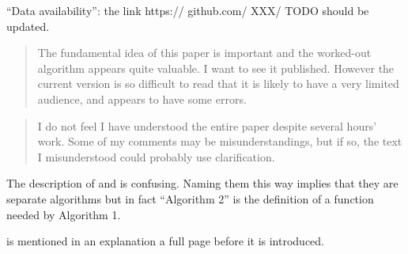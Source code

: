 \begin{point}{\revref} %
 ``Data availability'': the link https:// github.com/ XXX/ TODO should be updated.
\end{point}





\begin{quote}
The fundamental idea of this paper is important and the worked-out
algorithm appears quite valuable. I want to see it published. However
the current version is so difficult to read that it is likely to
have a very limited audience, and appears to have some errors.
\end{quote}

\begin{quote}
I do not feel I have understood the entire paper despite several
hours' work. Some of my comments may be misunderstandings, but if
so, the text I misunderstood could probably use clarification.
\end{quote}

\begin{point}{} %
The description of  and  is confusing.
Naming them this way implies that they are separate algorithms but
in fact ``Algorithm 2'' is the definition of a function needed by
Algorithm 1.
\end{point}


\begin{point}{} %
 is mentioned in an explanation a full page before it
is introduced.
\end{point}


